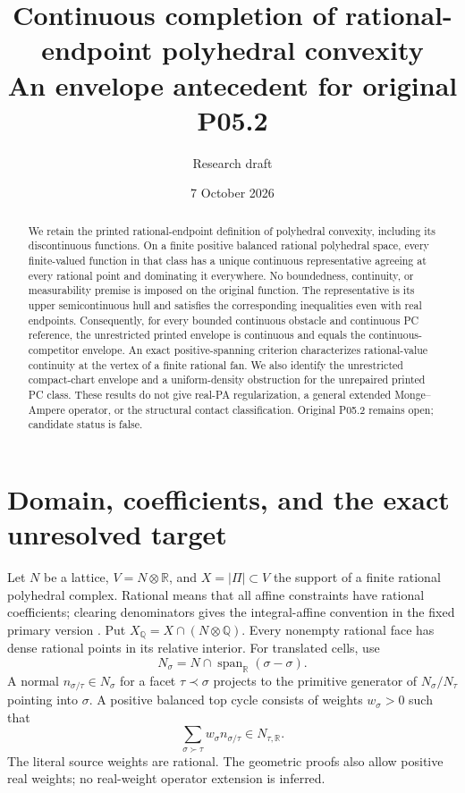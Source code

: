\documentclass[11pt]{article}
\title{Continuous completion of rational-endpoint polyhedral convexity\\\large An envelope antecedent for original P05.2}
\author{Research draft}
\date{7 October 2026}
\newcommand{\R}{\mathbb R}
\newcommand{\Q}{\mathbb Q}
\newcommand{\spanR}{\operatorname{span}_{\R}}
\begin{document}
\maketitle
\begin{abstract}
We retain the printed rational-endpoint definition of polyhedral convexity, including its discontinuous functions. On a finite positive balanced rational polyhedral space, every finite-valued function in that class has a unique continuous representative agreeing at every rational point and dominating it everywhere. No boundedness, continuity, or measurability premise is imposed on the original function. The representative is its upper semicontinuous hull and satisfies the corresponding inequalities even with real endpoints. Consequently, for every bounded continuous obstacle and continuous PC reference, the unrestricted printed envelope is continuous and equals the continuous-competitor envelope. An exact positive-spanning criterion characterizes rational-value continuity at the vertex of a finite rational fan. We also identify the unrestricted compact-chart envelope and a uniform-density obstruction for the unrepaired printed PC class. These results do not give real-PA regularization, a general extended Monge--Ampere operator, or the structural contact classification. Original P05.2 remains open; candidate status is false.
\end{abstract}

\section{Domain, coefficients, and the exact unresolved target}
Let $N$ be a lattice, $V=N\otimes\R$, and $X=|\Pi|\subset V$ the support of a finite rational polyhedral complex. Rational means that all affine constraints have rational coefficients; clearing denominators gives the integral-affine convention in the fixed primary version \cite{BMPS}. Put $X_\Q=X\cap(N\otimes\Q)$. Every nonempty rational face has dense rational points in its relative interior. For translated cells, use
\[N_\sigma=N\cap\spanR(\sigma-\sigma).\]
A normal $n_{\sigma/\tau}\in N_\sigma$ for a facet $\tau\prec\sigma$ projects to the primitive generator of $N_\sigma/N_\tau$ pointing into $\sigma$. A positive balanced top cycle consists of weights $w_\sigma>0$ such that
\begin{equation}\label{balance}
 \sum_{\sigma\succ\tau}w_\sigma n_{\sigma/\tau}\in N_{\tau,\R}.
\end{equation}
The literal source weights are rational. The geometric proofs also allow positive real weights; no real-weight operator extension is inferred.
\end{document}
